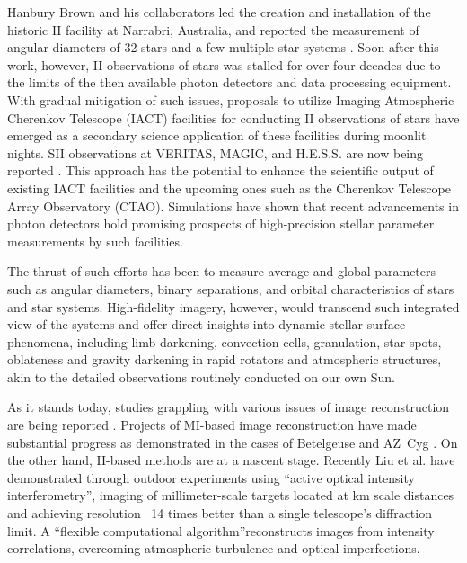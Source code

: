 Hanbury Brown and his collaborators led the creation and installation of the historic II facility at Narrabri, Australia, and reported the measurement of angular diameters of 32 stars and a few multiple star-systems \citep{hanbury1974angular}. Soon after this work, however, II observations of stars was stalled for over four decades due to the limits of the then available photon detectors and data processing equipment. With gradual mitigation of such issues, proposals to utilize Imaging Atmospheric Cherenkov Telescope (IACT) facilities for conducting II observations of stars have emerged\citep{LeBohec2006, nunez2010stellar, nunez2012high, 2013APh....43..331D} as a secondary science application of these facilities during moonlit nights. SII observations at VERITAS, MAGIC, and H.E.S.S. are now being reported \citep[e.g.,][]{2024ApJ...966...28A,2024MNRAS.529.4387A,2025MNRAS.537.2334V}. This approach has the potential to enhance the scientific output of existing IACT facilities and the upcoming ones such as the Cherenkov Telescope Array Observatory (CTAO). Simulations \citep[e.g.,][]{10.1093/mnras/stab2391, 10.1093/mnras/stac2433} have shown that recent advancements in photon detectors hold promising prospects of high-precision stellar parameter measurements by such facilities.

The thrust of such efforts has been to measure average and global parameters  such as angular diameters, binary separations, and orbital characteristics of stars and star systems. High-fidelity imagery, however, would transcend such integrated view of the systems and offer direct insights into dynamic stellar surface phenomena, including limb darkening, convection cells, granulation, star spots, oblateness and gravity darkening in rapid rotators and atmospheric structures, akin to the detailed observations routinely conducted on our own Sun.

As it stands today, studies grappling with various issues of image reconstruction are being reported \citep{Haubois2009, Norris2021AZCyg, Liu2024SuperresolutionII, Liu2025}. Projects of MI-based image reconstruction have made substantial progress as demonstrated in the cases of Betelgeuse \citep{Haubois2009} and AZ~Cyg \citep{Norris2021AZCyg}. On the other hand, II-based methods are at a nascent stage. Recently Liu et al. have demonstrated \citep{Liu2024SuperresolutionII, Liu2025} through outdoor experiments using ``active optical intensity interferometry'', imaging of millimeter-scale targets located at km scale distances and achieving resolution ~14 times better than a single telescope’s diffraction limit. A \textquotedblleft flexible computational algorithm\textquotedblright reconstructs images from intensity correlations, overcoming atmospheric turbulence and optical imperfections.

